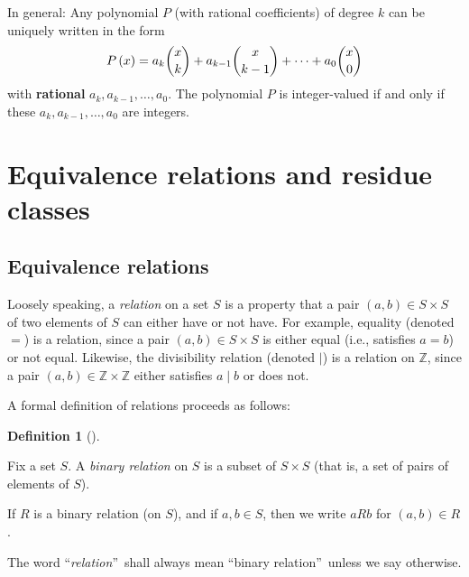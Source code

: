\documentclass[numbers=enddot,12pt,final,onecolumn,notitlepage]{scrartcl}%
\numberwithin{exer}{subsection}
\theoremstyle{definition}
\newtheorem{defi}[theo]{Definition}
\newenvironment{definition}[1][]
{\begin{defi}[#1]\begin{leftbar}}
{\end{leftbar}\end{defi}}
\begin{document}
In general: Any polynomial $P$ (with rational coefficients) of degree $k$ can
be uniquely written in the form%
\[
P\left(  x\right)  =a_{k}\dbinom{x}{k}+a_{k-1}\dbinom{x}{k-1}+\cdots
+a_{0}\dbinom{x}{0}%
\]
with \textbf{rational} $a_{k},a_{k-1},\ldots,a_{0}$. The polynomial $P$ is
integer-valued if and only if these $a_{k},a_{k-1},\ldots,a_{0}$ are integers.

\section{Equivalence relations and residue classes}

\subsection{Equivalence relations}

Loosely speaking, a \textit{relation} on a set $S$ is a property that a pair
$\left(  a,b\right)  \in S\times S$ of two elements of $S$ can either have or
not have. For example, equality (denoted $=$) is a relation, since a pair
$\left(  a,b\right)  \in S\times S$ is either equal (i.e., satisfies $a=b$) or
not equal. Likewise, the divisibility relation (denoted $\mid$) is a relation
on $\mathbb{Z}$, since a pair $\left(  a,b\right)  \in\mathbb{Z}%
\times\mathbb{Z}$ either satisfies $a\mid b$ or does not.

A formal definition of relations proceeds as follows:

\begin{definition}
Fix a set $S$. A \textit{binary relation} on $S$ is a subset of $S\times S$
(that is, a set of pairs of elements of $S$).

If $R$ is a binary relation (on $S$), and if $a,b\in S$, then we write $aRb$
for $\left(  a,b\right)  \in R$.

The word \textquotedblleft\textit{relation}\textquotedblright\ shall always
mean \textquotedblleft binary relation\textquotedblright\ unless we say otherwise.
\end{definition}
\end{document}

